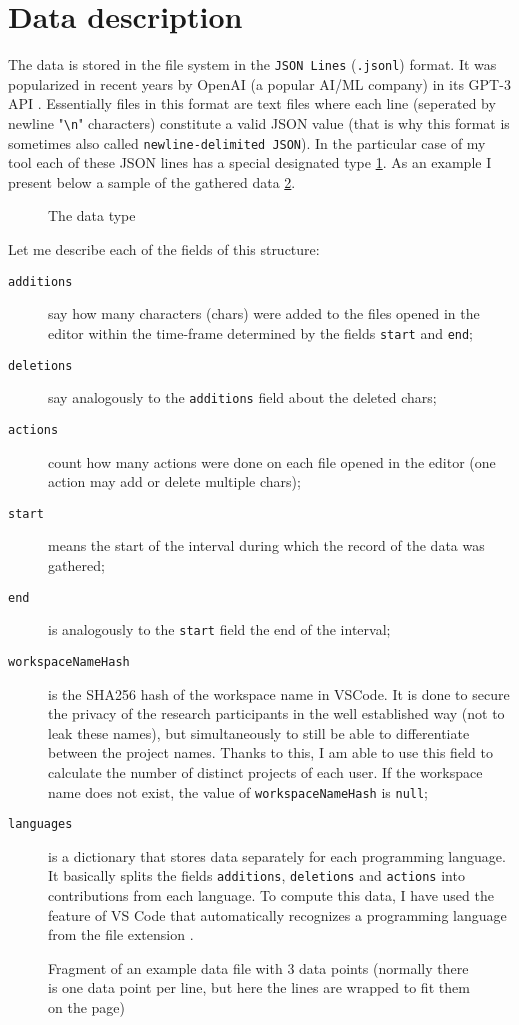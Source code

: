 \section{Data description}\label{sec:data_description}

The data is stored in the file system in the \texttt{JSON Lines} (\texttt{.jsonl}) \cite{JSONLines} format. It was popularized in recent years by OpenAI (a popular AI/ML company) in its GPT-3 API \cite{OpenAIGPT3}. Essentially files in this format are text files where each line (seperated by newline "\verb"\n"" characters) constitute a valid JSON value (that is why this format is sometimes also called \texttt{newline-delimited JSON}). In the particular case of my tool each of these JSON lines has a special designated type \ref{fig:event_type}. As an example I present below a sample of the gathered data \ref{fig:data_file_example}.

\begin{figure}[htbp]
    \centering
    
    \caption{The data type}
    \label{fig:event_type}
\end{figure}

Let me describe each of the fields of this structure:
\begin{description}
    \item[\texttt{additions}] say how many characters (chars) were added to the files opened in the editor within the time-frame determined by the fields \texttt{start} and \texttt{end};
    \item[\texttt{deletions}] say analogously to the \texttt{additions} field about the deleted chars;
    \item[\texttt{actions}] count how many actions were done on each file opened in the editor (one action may add or delete multiple chars);
    \item[\texttt{start}] means the start of the interval during which the record of the data was gathered;
    \item[\texttt{end}] is analogously to the \texttt{start} field the end of the interval;
    \item[\texttt{workspaceNameHash}] is the SHA256 \cite{NIST02SHS} hash of the workspace name in VSCode. It is done to secure the privacy of the research participants in the well established way (not to leak these names), but simultaneously to still be able to differentiate between the project names. Thanks to this, I am able to use this field to calculate the number of distinct projects of each user. If the workspace name does not exist, the value of \texttt{workspaceNameHash} is \texttt{null};
    \item[\texttt{languages}] is a dictionary that stores data separately for each programming language. It basically splits the fields \texttt{additions}, \texttt{deletions} and \texttt{actions} into contributions from each language. To compute this data, I have used the feature of VS Code that automatically recognizes a programming language from the file extension \cite{Mic22Langs}.
\end{description}

\begin{figure}[htbp]
    
    \caption{Fragment of an example data file with 3 data points (normally there is one data point per line, but here the lines are wrapped to fit them on the page)}
    \label{fig:data_file_example}
\end{figure}
